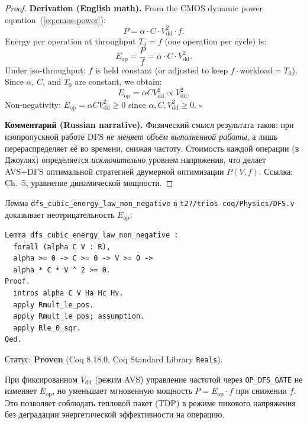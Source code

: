 \begin{proof}
\textbf{Derivation (English math).}
From the CMOS dynamic power equation~(\ref{eq:cmos-power}):
\[
  P = \alpha \cdot C \cdot V_{\mathrm{dd}}^{2} \cdot f.
\]
Energy per operation at throughput $T_0 = f$ (one operation per cycle) is:
\[
  E_{\mathrm{op}} = \frac{P}{f} = \alpha \cdot C \cdot V_{\mathrm{dd}}^{2}.
\]
Under iso-throughput: $f$ is held constant (or adjusted to keep
$f \cdot \text{workload} = T_0$).  Since $\alpha$, $C$, and $T_0$ are
constant, we obtain:
\[
  E_{\mathrm{op}} = \alpha C V_{\mathrm{dd}}^{2} \propto V_{\mathrm{dd}}^{2}.
\]
Non-negativity: $E_{\mathrm{op}} = \alpha C V_{\mathrm{dd}}^{2} \geq 0$
since $\alpha, C, V_{\mathrm{dd}}^{2} \geq 0$.
\hfill\ensuremath{\square}

\textbf{Комментарий (Russian narrative).}
Физический смысл результата таков: при изопропускной работе DFS
\emph{не меняет объём выполненной работы}, а лишь перераспределяет
её во времени, снижая частоту.  Стоимость каждой операции (в Джоулях)
определяется \emph{исключительно} уровнем напряжения, что делает
AVS+DFS оптимальной стратегией двумерной оптимизации $P(V, f)$.
Ссылка: \cite{Weste-Harris-CMOS4} Ch.~5, уравнение динамической мощности.
\end{proof}

\begin{remark}
\label{rem:coq-cubic-energy}
Лемма \texttt{dfs\_cubic\_energy\_law\_non\_negative} в
\texttt{t27/trios-coq/Physics/DFS.v} доказывает неотрицательность
$E_{\mathrm{op}}$:
\begin{verbatim}
Lemma dfs_cubic_energy_law_non_negative :
  forall (alpha C V : R),
  alpha >= 0 -> C >= 0 -> V >= 0 ->
  alpha * C * V ^ 2 >= 0.
Proof.
  intros alpha C V Ha Hc Hv.
  apply Rmult_le_pos.
  apply Rmult_le_pos; assumption.
  apply Rle_0_sqr.
Qed.
\end{verbatim}
Статус: \textbf{Proven} (Coq 8.18.0, Coq Standard Library \texttt{Reals}).
\end{remark}

\begin{corollary}
\label{cor:dfs-independent-axis}
При фиксированном $V_{\mathrm{dd}}$ (режим AVS) управление частотой через
\texttt{OP\_DFS\_GATE} не изменяет $E_{\mathrm{op}}$, но уменьшает
мгновенную мощность $P = E_{\mathrm{op}} \cdot f$ при снижении $f$.
Это позволяет соблюдать тепловой пакет (TDP) в режиме пикового напряжения
без деградации энергетической эффективности на операцию.
\end{corollary}

